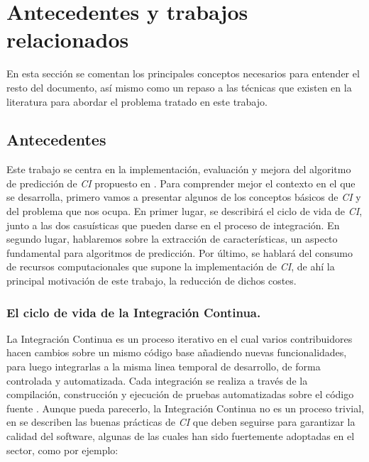 \section{Antecedentes y trabajos relacionados}
En esta sección se comentan los principales conceptos necesarios para entender el resto del
documento, así mismo como un repaso a las técnicas que existen en la literatura para abordar
el problema tratado en este trabajo.\\
\subsection{Antecedentes}
Este trabajo se centra en la implementación, evaluación y mejora del algoritmo de predicción de
\textit{CI} propuesto en \cite{2}. Para comprender mejor el contexto en el que se desarrolla,
primero vamos a presentar algunos de los conceptos básicos de \textit{CI} y del problema que
nos ocupa. En primer lugar, se describirá el ciclo de vida de \textit{CI}, junto a las dos
casuísticas que pueden darse en el proceso de integración. En segundo lugar, hablaremos sobre la
extracción de características, un aspecto fundamental para algoritmos de predicción. Por último,
se hablará del consumo de recursos computacionales que supone la implementación de \textit{CI},
de ahí la principal motivación de este trabajo, la reducción de dichos costes.


\subsubsection{El ciclo de vida de la Integración Continua.}
La Integración Continua es un proceso iterativo en el cual varios contribuidores hacen cambios
sobre un mismo código base añadiendo nuevas funcionalidades, para luego integrarlas a la misma
linea temporal de desarrollo, de forma controlada y automatizada. Cada integración se realiza
a través de la compilación, construcción y ejecución de pruebas automatizadas sobre el código
fuente \cite{10}. Aunque pueda parecerlo, la Integración Continua no es un proceso trivial, en
\cite{12} se describen las buenas prácticas de \textit{CI} que deben seguirse para garantizar
la calidad del software, algunas de las cuales han sido fuertemente adoptadas en el sector, como
por ejemplo:

